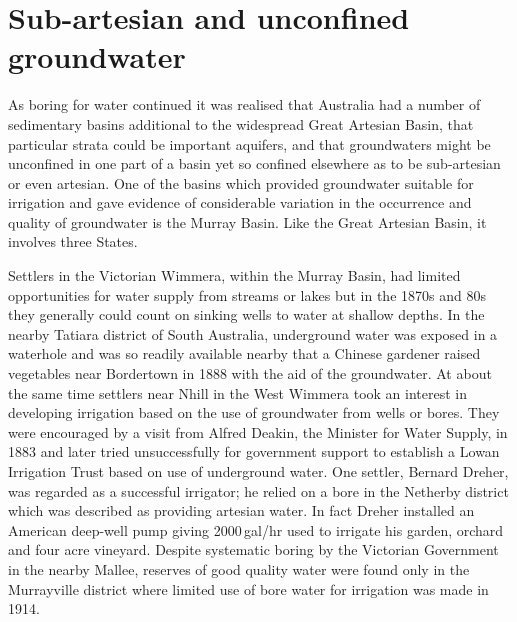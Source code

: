 \section*{Sub-artesian and unconfined groundwater}

As boring for water continued it was realised that Australia had a
number of sedimentary basins additional to the widespread Great
Artesian Basin, that particular strata could be important aquifers,
and that groundwaters might be unconfined in one part of a basin yet
so confined elsewhere as to be sub-artesian or even artesian.  One of
the basins which provided groundwater suitable for irrigation and gave
evidence of considerable variation in the occurrence and quality of
groundwater is the Murray Basin.  Like the Great Artesian Basin, it
involves three States.

Settlers in the Victorian Wimmera,  within the
Murray Basin, had limited opportunities for water supply from streams
or lakes but in the 1870s and 80s they generally could count on
sinking wells to water at shallow depths.  In the nearby Tatiara
district of South Australia, underground water was exposed in a
waterhole and was so readily available nearby that a Chinese gardener
raised vegetables near Bordertown  in 1888 with
the aid of the groundwater. At about the same time settlers near Nhill
in the West Wimmera took an interest in developing irrigation based on
the use of groundwater from wells or bores.  They were encouraged by a
visit from Alfred Deakin,  the Minister for Water
Supply, in 1883 and later tried unsuccessfully for government support
to establish a Lowan Irrigation Trust 
based on use of underground water.  One settler, Bernard Dreher,
  was regarded as a successful irrigator; he relied
on a bore in the Netherby district  which was
described as providing artesian water.  In fact Dreher installed an
American deep-well pump giving 2000\,gal/hr used to irrigate his
garden, orchard and four acre vineyard.  Despite systematic boring by
the Victorian Government in the nearby Mallee, 
reserves of good quality water were found only in the Murrayville
district where limited use of bore water for irrigation was made in
1914.

